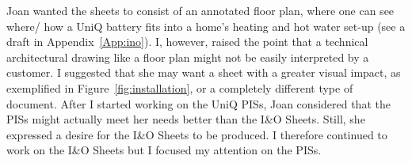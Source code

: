 Joan wanted the sheets to consist of an annotated floor plan, where one can see where/ how a UniQ battery fits into a home's heating and hot water set-up (see a draft in Appendix~\ref{App:ino}).
I, however, raised the point that a technical architectural drawing like a floor plan might not be easily interpreted by a customer.
I suggested that she may want a sheet with a greater visual impact, as exemplified in Figure~\ref{fig:installation}, or a completely different type of document.
After I started working on the UniQ PISs, Joan considered that the PISs might actually meet her needs better than the I\&O Sheets.
Still, she expressed a desire for the I\&O Sheets to be produced.
I therefore continued to work on the I\&O Sheets but I focused my attention on the PISs.


